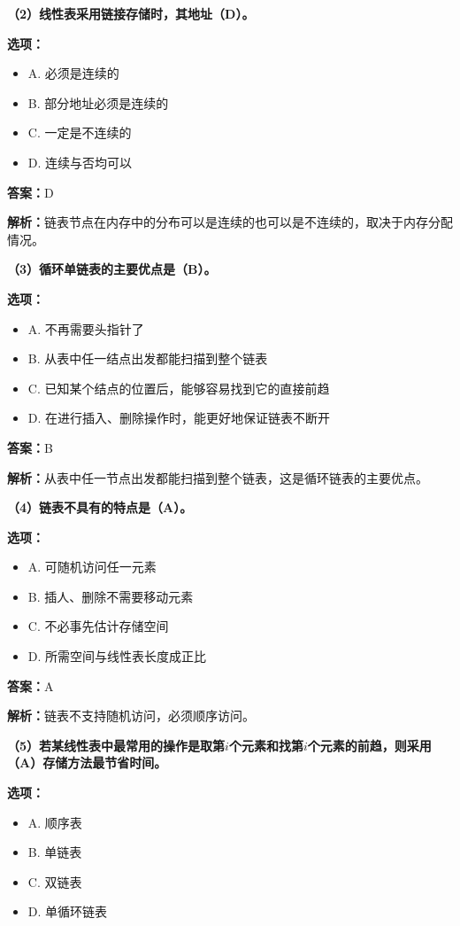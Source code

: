 \documentclass[12pt,a4paper]{amsart}
\begin{document}
\textbf{（2）线性表采用链接存储时，其地址（D）。}

\textbf{选项：}
\begin{itemize}
\item A. 必须是连续的
\item B. 部分地址必须是连续的
\item C. 一定是不连续的
\item D. 连续与否均可以
\end{itemize}

\textbf{答案：}D

\textbf{解析：}链表节点在内存中的分布可以是连续的也可以是不连续的，取决于内存分配情况。

\textbf{（3）循环单链表的主要优点是（B）。}

\textbf{选项：}
\begin{itemize}
\item A. 不再需要头指针了
\item B. 从表中任一结点出发都能扫描到整个链表
\item C. 已知某个结点的位置后，能够容易找到它的直接前趋
\item D. 在进行插入、删除操作时，能更好地保证链表不断开
\end{itemize}

\textbf{答案：}B

\textbf{解析：}从表中任一节点出发都能扫描到整个链表，这是循环链表的主要优点。

\textbf{（4）链表不具有的特点是（A）。}

\textbf{选项：}
\begin{itemize}
\item A. 可随机访问任一元素
\item B. 插人、删除不需要移动元素
\item C. 不必事先估计存储空间
\item D. 所需空间与线性表长度成正比
\end{itemize}

\textbf{答案：}A

\textbf{解析：}链表不支持随机访问，必须顺序访问。

\textbf{（5）若某线性表中最常用的操作是取第$i$个元素和找第$i$个元素的前趋，则采用（A）存储方法最节省时间。}

\textbf{选项：}
\begin{itemize}
\item A. 顺序表
\item B. 单链表
\item C. 双链表
\item D. 单循环链表
\end{itemize}
\end{document}
